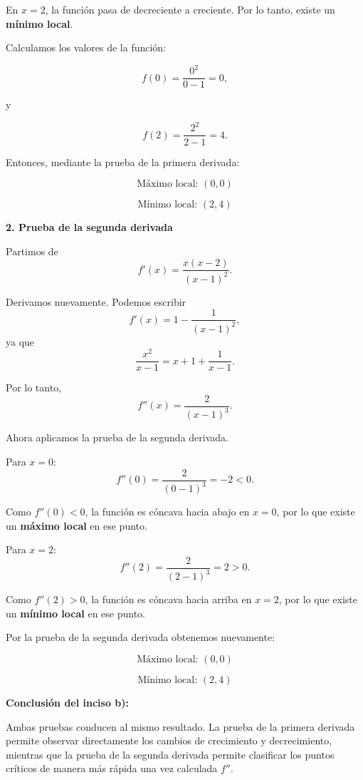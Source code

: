 \documentclass[12pt]{article}
\begin{document}
\begin{enumerate}[label=\alph*.-]
    En $x=2$, la función pasa de decreciente a creciente. Por lo tanto,
    existe un \textbf{mínimo local}.

    Calculamos los valores de la función:

    \[
    f(0)=\frac{0^2}{0-1}=0,
    \]

    y

    \[
    f(2)=\frac{2^2}{2-1}=4.
    \]

    Entonces, mediante la prueba de la primera derivada:

    \[
    \boxed{\text{Máximo local: }(0,0)}
    \]

    \[
    \boxed{\text{Mínimo local: }(2,4)}
    \]

    \vspace{0.5cm}

    \textbf{2. Prueba de la segunda derivada}

    Partimos de
    \[
    f'(x)=\frac{x(x-2)}{(x-1)^2}.
    \]

    Derivamos nuevamente. Podemos escribir
    \[
    f'(x)=1-\frac{1}{(x-1)^2},
    \]
    ya que
    \[
    \frac{x^2}{x-1}=x+1+\frac{1}{x-1}.
    \]

    Por lo tanto,
    \[
    f''(x)
    =
    \frac{2}{(x-1)^3}.
    \]

    Ahora aplicamos la prueba de la segunda derivada.

    Para $x=0$:
    \[
    f''(0)
    =
    \frac{2}{(0-1)^3}
    =
    -2<0.
    \]

    Como $f''(0)<0$, la función es cóncava hacia abajo en $x=0$,
    por lo que existe un \textbf{máximo local} en ese punto.

    Para $x=2$:
    \[
    f''(2)
    =
    \frac{2}{(2-1)^3}
    =
    2>0.
    \]

    Como $f''(2)>0$, la función es cóncava hacia arriba en $x=2$,
    por lo que existe un \textbf{mínimo local} en ese punto.

    Por la prueba de la segunda derivada obtenemos nuevamente:

    \[
    \boxed{\text{Máximo local: }(0,0)}
    \]

    \[
    \boxed{\text{Mínimo local: }(2,4)}
    \]

    \textbf{Conclusión del inciso b):}

    Ambas pruebas conducen al mismo resultado. La prueba de la primera
    derivada permite observar directamente los cambios de crecimiento
    y decrecimiento, mientras que la prueba de la segunda derivada
    permite clasificar los puntos críticos de manera más rápida una vez
    calculada $f''$.



\end{enumerate}
\end{document}

